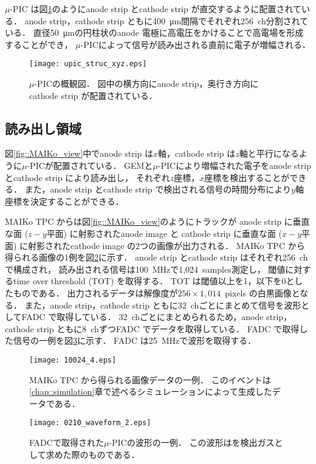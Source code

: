 \documentclass[../master]{subfiles}
\begin{document}
$\mu$-PIC は図\ref{fig::mupic}のようにanode strip とcathode strip が直交するように配置されている．
anode strip，cathode strip ともに\SI{400}{\micro\metre}間隔でそれぞれ256~ch分割されている．
直径\SI{50}{\micro\metre}の円柱状のanode 電極に高電圧をかけることで高電場を形成することができ，
$\mu$-PICによって信号が読み出される直前に電子が増幅される．
\begin{figure}
  \centering
  \texttt{[image: upic\_struc\_xyz.eps]}
  \caption[$\mu$-PICの概観図．]{$\mu$-PICの概観図．
    図中の横方向にanode strip，奥行き方向にcathode strip が配置されている．
  }
  \label{fig::mupic}
\end{figure}

\subsection{読み出し領域}
\label{sec::mu-pic}
図\ref{fig::MAIKo_view}中でanode strip は$x$軸，cathode strip は$z$軸と平行になるように$\mu$-PICが配置されている．
GEMと$\mu$-PICにより増幅された電子をanode strip とcathode strip により読み出し，
それぞれ$z$座標，$x$座標を検出することができる．
また，anode strip とcathode strip で検出される信号の時間分布により$y$軸座標を決定することができる．

MAIKo TPC からは図\ref{fig::MAIKo_view}のようにトラックが
anode strip に垂直な面 ($z-y$平面) に射影されたanode image と
cathode strip に垂直な面 ($x-y$平面) に射影されたcathode image の2つの画像が出力される．
MAIKo TPC から得られる画像の1例を図\ref{fig::track_demo}に示す．
anode strip とcathode strip はそれぞれ256~chで構成され，
読み出される信号は\SI{100}{\mega\hertz}で1,024~samples測定し，
閾値に対するtime over threshold (TOT) を取得する．
TOT は閾値以上を1，以下を0としたものである．
出力されるデータは解像度が$256\times1,014$~pixels の白黒画像となる．
また，anode strip，cathode strip ともに32~chごとにまとめて信号を波形としてFADC で取得している．
32~chごとにまとめられるため，anode strip，cathode strip ともに8~chずつFADC でデータを取得している．
FADC で取得した信号の一例を図\ref{fig::FADC_waveform}に示す．
FADC は\SI{25}{\mega\hertz}で波形を取得する．
\begin{figure}
  \centering
  \texttt{[image: 10024\_4.eps]}
  \caption[MAIKo TPC から得られる画像データの一例．]
          {MAIKo TPC から得られる画像データの一例．
          このイベントは\ref{chap::simulation}章で述べるシミュレーションによって生成したデータである．}
  \label{fig::track_demo}
\end{figure}
\begin{figure}
  \centering
  \texttt{[image: 0210\_waveform\_2.eps]}
  \caption[FADCで取得された$\mu$-PICの波形の一例．]
          {FADCで取得された$\mu$-PICの波形の一例．
          この波形は\isoButaneHydro を検出ガスとして求めた際のものである．}
  \label{fig::FADC_waveform}
\end{figure}
\end{document}
